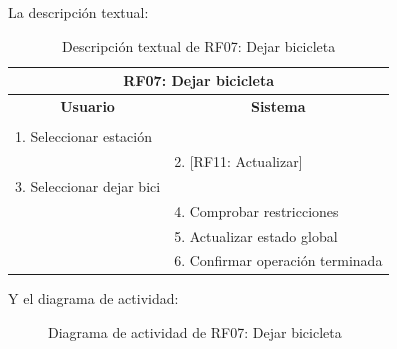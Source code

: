 \begin{itemize}
	La descripción textual:
	\begin{table}[h]
		\centering	
		\begin{tabular}{|l|l|}
			\hline
			\multicolumn{2}{|c|}{\textbf{RF07: Dejar bicicleta}} \\ \hline
			\multicolumn{1}{|c|}{\textbf{Usuario}} & \multicolumn{1}{c|}{\textbf{Sistema}} \\ \hline
			[Pto. inclusión: RF02: Loguear usuario] &\\ \hline
			1. Seleccionar estación &\\ \hline
			& 2. [RF11: Actualizar] \\ \hline
			3. Seleccionar dejar bici &\\ \hline
			& 4. Comprobar restricciones \\ \hline
			& 5. Actualizar estado global \\ \hline
			& 6. Confirmar operación terminada \\ \hline 
		\end{tabular}
		\caption{Descripción textual de RF07: Dejar bicicleta}
		\label{tab:tablaDescTextualRF07}
	\end{table}
	
	\FloatBarrier
	Y el diagrama de actividad:
	\begin{figure}[!htb]
		\centering
		\caption{Diagrama de actividad de RF07: Dejar bicicleta}
		\label{fig:diagramaActividad_RF07}
	\end{figure}
	

\end{itemize}
